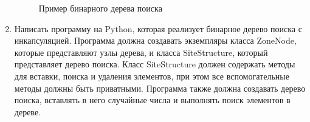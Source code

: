 \begin{enumerate}
\begin{figure}[h]
\centering
{}
\caption{Пример бинарного дерева поиска}
\end{figure}

\item Написать программу на Python, которая реализует бинарное дерево поиска с инкапсуляцией. Программа должна создавать экземпляры класса ZoneNode, которые представляют узлы дерева, и класса SiteStructure, который представляет дерево поиска. Класс SiteStructure должен содержать методы для вставки, поиска и удаления элементов, при этом все вспомогательные методы должны быть приватными. Программа также должна создавать дерево поиска, вставлять в него случайные числа и выполнять поиск элементов в дереве.


\end{enumerate}
